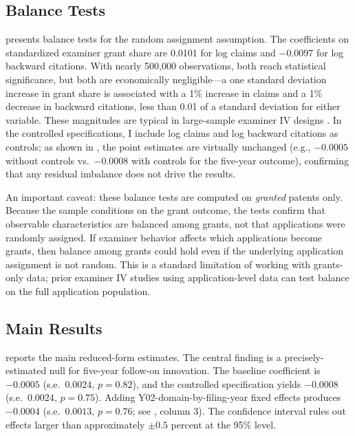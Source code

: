 \documentclass[12pt]{article}
\begin{document}
\subsection{Balance Tests}



 presents balance tests for the random assignment assumption. The coefficients on standardized examiner grant share are 0.0101 for log claims and $-0.0097$ for log backward citations. With nearly 500,000 observations, both reach statistical significance, but both are economically negligible---a one standard deviation increase in grant share is associated with a 1\% increase in claims and a 1\% decrease in backward citations, less than 0.01 of a standard deviation for either variable. These magnitudes are typical in large-sample examiner IV designs \citep{farremensa2020, sampat2019}. In the controlled specifications, I include log claims and log backward citations as controls; as shown in , the point estimates are virtually unchanged (e.g., $-0.0005$ without controls vs.\ $-0.0008$ with controls for the five-year outcome), confirming that any residual imbalance does not drive the results.

\label{sec:balance_caveat}An important caveat: these balance tests are computed on \emph{granted} patents only. Because the sample conditions on the grant outcome, the tests confirm that observable characteristics are balanced among grants, not that applications were randomly assigned. If examiner behavior affects which applications become grants, then balance among grants could hold even if the underlying application assignment is not random. This is a standard limitation of working with grants-only data; prior examiner IV studies using application-level data \citep{farremensa2020, sampat2019} can test balance on the full application population.

\subsection{Main Results}



 reports the main reduced-form estimates. The central finding is a precisely-estimated null for five-year follow-on innovation. The baseline coefficient is $-0.0005$ (s.e.\ $0.0024$, $p = 0.82$), and the controlled specification yields $-0.0008$ (s.e.\ $0.0024$, $p = 0.75$). Adding Y02-domain-by-filing-year fixed effects produces $-0.0004$ (s.e.\ $0.0013$, $p = 0.76$; see , column 3). The confidence interval rules out effects larger than approximately $\pm 0.5$ percent at the 95\% level.
\end{document}
